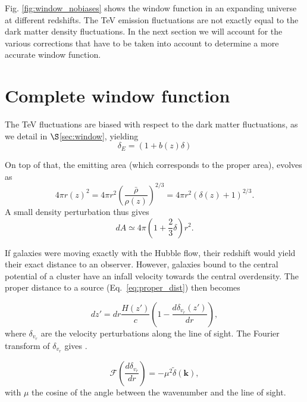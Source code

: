 \documentclass[twocolumns]{emulateapj}
\begin{document}
Fig. \ref{fig:window_nobiases} shows the window function in an expanding universe at different redshifts.  %
The TeV emission fluctuations are not exactly equal to the dark matter density fluctuations. In the next section we will account for the various corrections that have to be taken into account to determine a more accurate window function.


\section{Complete window function}

The TeV fluctuations are biased with respect to the dark matter fluctuations, as we detail in $\S$\ref{sec:window}, yielding 
\begin{equation}
  \delta_E=(1+b(z)\delta)
\label{eq:bias}
\end{equation}

On top of that, the emitting area (which corresponds to the proper area), evolves as
  \begin{equation}
    \label{eq:emitting_area}
4\pi r(z)^2=4\pi r^2\left(\frac{\bar{\rho}}{\rho(z)}\right)^{2/3}=4\pi r^2(\delta(z)+1)^{2/3}.
  \end{equation}
A small density perturbation thus gives
\begin{equation}
  \label{eq:pert_area}
dA\simeq 4\pi \left(1+\frac{2}{3}\delta\right)r^2.
\end{equation}

If galaxies were moving exactly with the Hubble flow, their redshift would yield their exact distance to an observer. However, galaxies bound to the central potential of a cluster have an infall velocity towards the central overdensity. The proper distance to a source  (Eq.~\eqref{eq:proper_dist}) then becomes

  \begin{equation}
    \label{eq:vel_perturb}
    dz'=dr\frac{H(z')}{c}\left(1-\frac{d\delta_{v_r}(z')}{dr}\right),
  \end{equation}
where $\delta_{v_r}$ are the velocity perturbations along the line of sight. The Fourier transform of $\delta_{v_r}$ gives  \citep{1987MNRAS.227....1K}.

\begin{equation}
  \label{eq:kaiser2}
  \mathcal{F}\left(\frac{d\delta_{v_r}}{dr}\right)=-\mu^2\tilde{\delta}(\mathbf{k}),
\end{equation}
with $\mu$ the cosine of the angle between the wavenumber and the line of sight.
\end{document}
